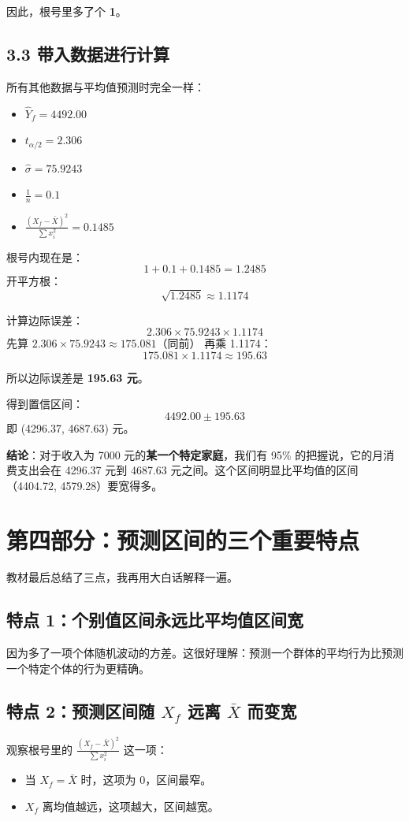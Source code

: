 \documentclass[12pt,a4paper]{article}
\begin{document}
因此，根号里多了个 \textbf{1}。

\subsection*{3.3 带入数据进行计算}

所有其他数据与平均值预测时完全一样：
\begin{itemize}
\item \(\hat{Y}_f = 4492.00\)
\item \(t_{\alpha/2} = 2.306\)
\item \(\hat{\sigma} = 75.9243\)
\item \(\frac{1}{n} = 0.1\)
\item \(\frac{(X_f - \bar{X})^2}{\sum x_i^2} = 0.1485\)
\end{itemize}

根号内现在是：
\[
1 + 0.1 + 0.1485 = 1.2485
\]
开平方根：
\[
\sqrt{1.2485} \approx 1.1174
\]

计算边际误差：
\[
2.306 \times 75.9243 \times 1.1174
\]
先算 \(2.306 \times 75.9243 \approx 175.081\)（同前）
再乘 1.1174：
\[
175.081 \times 1.1174 \approx 195.63
\]

所以边际误差是 \textbf{195.63 元}。

得到置信区间：
\[
4492.00 \pm 195.63
\]
即 (4296.37, 4687.63) 元。

\textbf{结论}：对于收入为 7000 元的\textbf{某一个特定家庭}，我们有 95\% 的把握说，它的月消费支出会在 4296.37 元到 4687.63 元之间。这个区间明显比平均值的区间（4404.72, 4579.28）要宽得多。

\section*{第四部分：预测区间的三个重要特点}

教材最后总结了三点，我再用大白话解释一遍。

\subsection*{特点 1：个别值区间永远比平均值区间宽}
因为多了一项个体随机波动的方差。这很好理解：预测一个群体的平均行为比预测一个特定个体的行为更精确。

\subsection*{特点 2：预测区间随 \(X_f\) 远离 \(\bar{X}\) 而变宽}
观察根号里的 \(\frac{(X_f - \bar{X})^2}{\sum x_i^2}\) 这一项：
\begin{itemize}
\item 当 \(X_f = \bar{X}\) 时，这项为 0，区间最窄。
\item \(X_f\) 离均值越远，这项越大，区间越宽。
\end{itemize}
\end{document}
